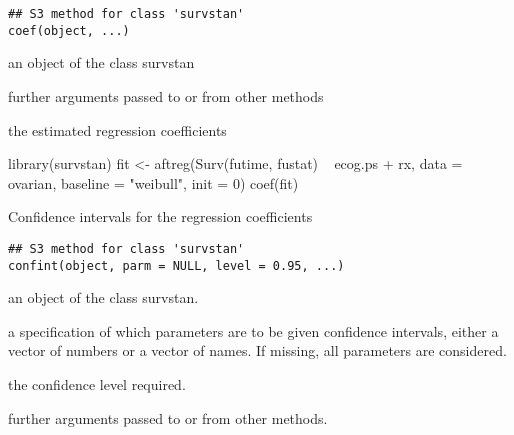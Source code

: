 \documentclass[letterpaper]{book}
\begin{document}
%
\begin{Usage}
\begin{verbatim}
## S3 method for class 'survstan'
coef(object, ...)
\end{verbatim}
\end{Usage}
%
\begin{Arguments}
\begin{ldescription}
\item[\code{object}] an object of the class survstan

\item[\code{...}] further arguments passed to or from other methods
\end{ldescription}
\end{Arguments}
%
\begin{Value}
the estimated regression coefficients
\end{Value}
%
\begin{Examples}
\begin{ExampleCode}

library(survstan)
fit <- aftreg(Surv(futime, fustat) ~ ecog.ps + rx, data = ovarian, baseline = "weibull", init = 0)
coef(fit)


\end{ExampleCode}
\end{Examples}
%
\begin{Description}\relax
Confidence intervals for the regression coefficients
\end{Description}
%
\begin{Usage}
\begin{verbatim}
## S3 method for class 'survstan'
confint(object, parm = NULL, level = 0.95, ...)
\end{verbatim}
\end{Usage}
%
\begin{Arguments}
\begin{ldescription}
\item[\code{object}] an object of the class survstan.

\item[\code{parm}] a specification of which parameters are to be given confidence intervals, either a vector of numbers or a vector of names. If missing, all parameters are considered.

\item[\code{level}] the confidence level required.

\item[\code{...}] further arguments passed to or from other methods.
\end{ldescription}
\end{Arguments}
\end{document}
